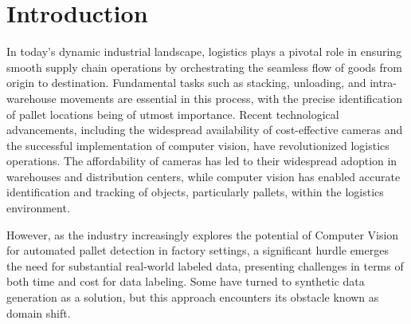 \documentclass[sigconf,authordraft]{acmart}
\begin{document}



\maketitle

\section{Introduction}
In today's dynamic industrial landscape, logistics plays a pivotal role in ensuring smooth supply chain operations by orchestrating the seamless flow of goods from origin to destination. Fundamental tasks such as stacking, unloading, and intra-warehouse movements are essential in this process, with the precise identification of pallet locations being of utmost importance. Recent technological advancements, including the widespread availability of cost-effective cameras and the successful implementation of computer vision, have revolutionized logistics operations\cite{21,22, hoang2019object, hoang2020object, vu2024occlusion, palleschi2020fully}. The affordability of cameras has led to their widespread adoption in warehouses and distribution centers, while computer vision has enabled accurate identification and tracking of objects\cite{26, 27, 28, hoang2016sub, hoang2022context, hoang2023grasp, hoang2022voting}, particularly pallets, within the logistics environment.

\noindent However, as the industry increasingly explores the potential of Computer Vision for automated pallet detection in factory settings, a significant hurdle emerges the need for substantial real-world labeled data, presenting challenges in terms of both time and cost for data labeling. Some have turned to synthetic data generation as a solution\cite{1}\cite{2}\cite{3}, but this approach encounters its obstacle known as domain shift.
\end{document}
